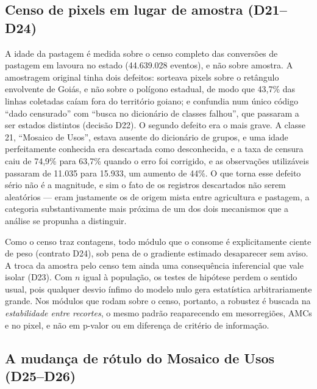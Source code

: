 \subsection{Censo de pixels em lugar de amostra (D21--D24)}
\label{sec:met-d21}

A idade da pastagem é medida sobre o censo completo das conversões de pastagem
em lavoura no estado (44.639.028 eventos), e não sobre amostra. A amostragem
original tinha dois defeitos: sorteava pixels sobre o retângulo envolvente de
Goiás, e não sobre o polígono estadual, de modo que 43,7\% das linhas
coletadas caíam fora do território goiano; e confundia num único código ``dado
censurado'' com ``busca no dicionário de classes falhou'', que passaram a ser
estados distintos (decisão D22). O segundo defeito era o mais grave. A classe
21, ``Mosaico de Usos'', estava ausente do dicionário de grupos, e uma idade
perfeitamente conhecida era descartada como desconhecida, e a taxa de censura
caiu de 74,9\% para 63,7\% quando o erro foi corrigido, e as observações
utilizáveis passaram de 11.035 para 15.933, um aumento de 44\%. O que torna
esse defeito sério não é a magnitude, e sim o fato de os registros
descartados não serem aleatórios --- eram justamente os de origem mista entre
agricultura e pastagem, a categoria substantivamente mais próxima de um dos
dois mecanismos que a análise se propunha a distinguir.

Como o censo traz contagens, todo módulo que o consome é explicitamente ciente
de peso (contrato D24), sob pena de o gradiente estimado desaparecer sem
aviso. A troca da amostra pelo censo tem ainda uma
consequência inferencial que vale isolar (D23). Com $n$ igual à população, os
testes de hipótese perdem o sentido usual, pois qualquer desvio ínfimo do modelo
nulo gera estatística arbitrariamente grande. Nos módulos que rodam sobre o
censo, portanto, a robustez é buscada na \emph{estabilidade entre recortes}, o
mesmo padrão reaparecendo em mesorregiões, AMCs e no pixel, e não em p-valor
ou em diferença de critério de informação.

\subsection{A mudança de rótulo do Mosaico de Usos (D25--D26)}
\label{sec:met-d25}

